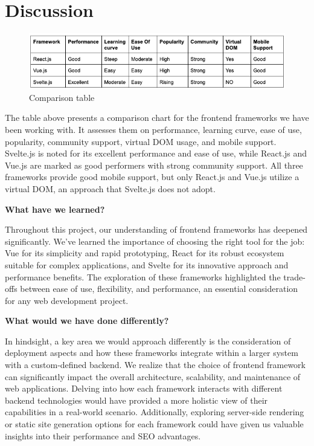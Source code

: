 \section{Discussion}

\begin{figure}[!htbp]
\centering
\includegraphics[width=\linewidth]{figs/compare.png}
\caption{Comparison table}
\label{fig:compare}
\end{figure}

The table above presents a comparison chart for the frontend frameworks we have been working with. It assesses them on performance, learning curve, ease of use, popularity, community support, virtual DOM usage, and mobile support. Svelte.js is noted for its excellent performance and ease of use, while React.js and Vue.js are marked as good performers with strong community support. All three frameworks provide good mobile support, but only React.js and Vue.js utilize a virtual DOM, an approach that Svelte.js does not adopt.

\textbf{What have we learned?}

Throughout this project, our understanding of frontend frameworks has deepened significantly. We've learned the importance of choosing the right tool for the job: Vue for its simplicity and rapid prototyping, React for its robust ecosystem suitable for complex applications, and Svelte for its innovative approach and performance benefits. The exploration of these frameworks highlighted the trade-offs between ease of use, flexibility, and performance, an essential consideration for any web development project.

\textbf{What would we have done differently?}

In hindsight, a key area we would approach differently is the consideration of deployment aspects and how these frameworks integrate within a larger system with a custom-defined backend. We realize that the choice of frontend framework can significantly impact the overall architecture, scalability, and maintenance of web applications. Delving into how each framework interacts with different backend technologies would have provided a more holistic view of their capabilities in a real-world scenario. Additionally, exploring server-side rendering or static site generation options for each framework could have given us valuable insights into their performance and SEO advantages.

